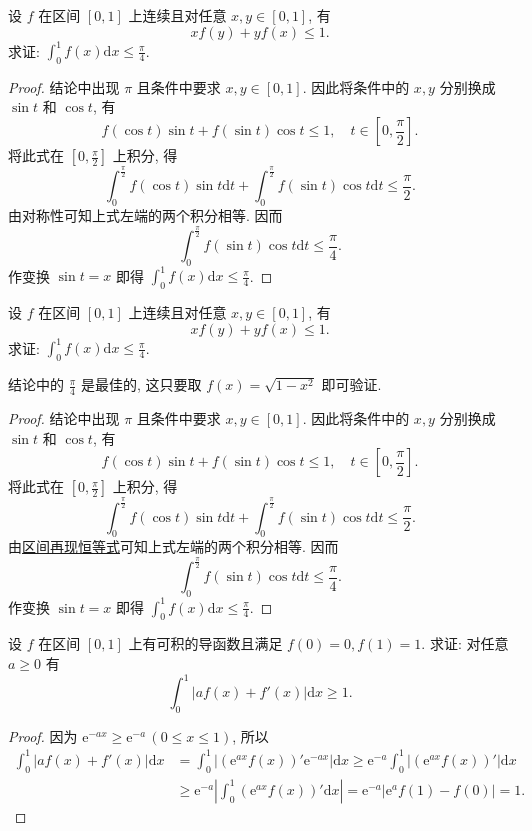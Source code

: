 \documentclass[../../main.tex]{subfiles}
\begin{document}
\begin{example}
设 $f$ 在区间 $[0,1]$ 上连续且对任意 $x,y\in[0,1]$, 有
$$xf(y)+yf(x)\leqslant 1.$$
求证: $\int_0^1 f(x)\mathrm{d}x\leqslant \frac{\pi}{4}$.
\end{example}
\begin{proof}
结论中出现 $\pi$ 且条件中要求 $x,y\in[0,1]$. 因此将条件中的 $x,y$ 分别换成 $\sin t$ 和 $\cos t$, 有
$$f(\cos t)\sin t+f(\sin t)\cos t\leqslant 1,\quad t\in\left[0,\frac{\pi}{2}\right].$$
将此式在 $\left[0,\frac{\pi}{2}\right]$ 上积分, 得
$$\int_0^{\frac{\pi}{2}}f(\cos t)\sin t\mathrm{d}t+\int_0^{\frac{\pi}{2}}f(\sin t)\cos t\mathrm{d}t\leqslant \frac{\pi}{2}.$$
由对称性可知上式左端的两个积分相等. 因而
$$\int_0^{\frac{\pi}{2}}f(\sin t)\cos t\mathrm{d}t\leqslant \frac{\pi}{4}.$$
作变换 $\sin t=x$ 即得 $\int_0^1 f(x)\mathrm{d}x\leqslant \frac{\pi}{4}$.

\end{proof}

\begin{example}
设 $f$ 在区间 $[0,1]$ 上连续且对任意 $x,y\in[0,1]$, 有
$$xf(y)+yf(x)\leqslant 1.$$
求证: $\int_0^1 f(x)\mathrm{d}x\leqslant \frac{\pi}{4}$.
\end{example}
\begin{remark}
结论中的 $\frac{\pi}{4}$ 是最佳的, 这只要取 $f(x)=\sqrt{1-x^2}$ 即可验证.
\end{remark}
\begin{proof}
结论中出现 $\pi$ 且条件中要求 $x,y\in[0,1]$. 因此将条件中的 $x,y$ 分别换成 $\sin t$ 和 $\cos t$, 有
$$f(\cos t)\sin t+f(\sin t)\cos t\leqslant 1,\quad t\in\left[0,\frac{\pi}{2}\right].$$
将此式在 $\left[0,\frac{\pi}{2}\right]$ 上积分, 得
$$\int_0^{\frac{\pi}{2}}f(\cos t)\sin t\mathrm{d}t+\int_0^{\frac{\pi}{2}}f(\sin t)\cos t\mathrm{d}t\leqslant \frac{\pi}{2}.$$
由\hyperref[theorem:区间再现恒等式]{区间再现恒等式}可知上式左端的两个积分相等. 因而
$$\int_0^{\frac{\pi}{2}}f(\sin t)\cos t\mathrm{d}t\leqslant \frac{\pi}{4}.$$
作变换 $\sin t=x$ 即得 $\int_0^1 f(x)\mathrm{d}x\leqslant \frac{\pi}{4}$.

\end{proof}

\begin{example}
设 $f$ 在区间 $[0,1]$ 上有可积的导函数且满足 $f(0)=0,f(1)=1$. 求证: 对任意 $a\geqslant 0$ 有
$$\int_0^1|af(x)+f'(x)|\mathrm{d}x\geqslant 1.$$
\end{example}
\begin{proof}
因为 $\mathrm{e}^{-ax}\geqslant \mathrm{e}^{-a}\,(0\leqslant  x\leqslant 1)$, 所以
$$
\begin{aligned}
\int_0^1|af(x)+f'(x)|\mathrm{d}x &= \int_0^1|(\mathrm{e}^{ax}f(x))'\mathrm{e}^{-ax}|\mathrm{d}x \geqslant  \mathrm{e}^{-a}\int_0^1|(\mathrm{e}^{ax}f(x))'|\mathrm{d}x \\
&\geqslant  \mathrm{e}^{-a}\left|\int_0^1(\mathrm{e}^{ax}f(x))'\mathrm{d}x\right| = \mathrm{e}^{-a}|\mathrm{e}^{a}f(1)-f(0)| = 1.
\end{aligned}
$$

\end{proof}
\end{document}
